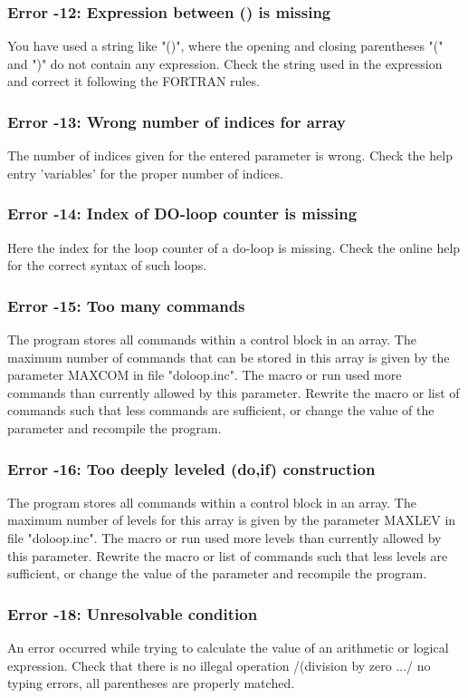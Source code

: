 \subsubsection{Error -12: Expression between () is missing}
\par
You have used a string like "()", where the opening and closing 
parentheses "(" and ")" do not contain any expression. 
Check the string used in the expression and correct it following the 
FORTRAN rules. 
\subsubsection{Error -13: Wrong number of indices for array}
\par
The number of indices given for the entered parameter is wrong. 
Check the help entry 'variables' for the proper number of indices. 
\subsubsection{Error -14: Index of DO-loop counter is missing}
\par
Here the index for the loop counter of a do-loop is missing. Check 
the online help for the correct syntax of such loops. 
\subsubsection{Error -15: Too many commands}
\par
The program stores all commands within a control block in an array. 
The maximum number of commands that can be stored in this array is 
given by the parameter MAXCOM in file "doloop.inc". The macro or run 
used more commands than currently allowed by this parameter. 
Rewrite the macro or list of commands such that less commands are 
sufficient, or change the value of the parameter and recompile the 
program. 
\subsubsection{Error -16: Too deeply leveled (do,if) construction}
\par
The program stores all commands within a control block in an array. 
The maximum number of levels for this array is given by the parameter 
MAXLEV in file "doloop.inc". The macro or run used more levels than 
currently allowed by this parameter. 
Rewrite the macro or list of commands such that less levels are 
sufficient, or change the value of the parameter and recompile the 
program. 
\subsubsection{Error -18: Unresolvable condition}
\par
An error occurred while trying to calculate the value of an arithmetic 
or logical expression. Check that there is no illegal operation /(division 
by zero .../ no typing errors, all parentheses are properly matched. 
